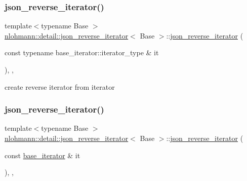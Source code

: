 \subsubsection{\texorpdfstring{json\_reverse\_iterator()}{json\_reverse\_iterator()}\hspace{0.1cm}{\footnotesize\ttfamily [1/2]}}
{\footnotesize\ttfamily template$<$typename Base $>$ \\
\mbox{\hyperlink{classnlohmann_1_1detail_1_1json__reverse__iterator}{nlohmann\+::detail\+::json\+\_\+reverse\+\_\+iterator}}$<$ Base $>$\+::\mbox{\hyperlink{classnlohmann_1_1detail_1_1json__reverse__iterator}{json\+\_\+reverse\+\_\+iterator}} (\begin{DoxyParamCaption}\item[{const typename base\+\_\+iterator\+::iterator\+\_\+type \&}]{it }\end{DoxyParamCaption})\hspace{0.3cm}{\ttfamily [inline]}, {\ttfamily [explicit]}, {\ttfamily [noexcept]}}



create reverse iterator from iterator 

\mbox{\label{classnlohmann_1_1detail_1_1json__reverse__iterator_a6c2d025530114ed989188e8adfc8467e}} 
\subsubsection{\texorpdfstring{json\_reverse\_iterator()}{json\_reverse\_iterator()}\hspace{0.1cm}{\footnotesize\ttfamily [2/2]}}
{\footnotesize\ttfamily template$<$typename Base $>$ \\
\mbox{\hyperlink{classnlohmann_1_1detail_1_1json__reverse__iterator}{nlohmann\+::detail\+::json\+\_\+reverse\+\_\+iterator}}$<$ Base $>$\+::\mbox{\hyperlink{classnlohmann_1_1detail_1_1json__reverse__iterator}{json\+\_\+reverse\+\_\+iterator}} (\begin{DoxyParamCaption}\item[{const \mbox{\hyperlink{classnlohmann_1_1detail_1_1json__reverse__iterator_a6b2ef1d632fe49bfcc22fbd1abd62395}{base\+\_\+iterator}} \&}]{it }\end{DoxyParamCaption})\hspace{0.3cm}{\ttfamily [inline]}, {\ttfamily [explicit]}, {\ttfamily [noexcept]}}




